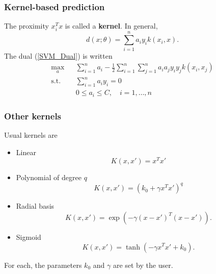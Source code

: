 \begin{frame}
\frametitle{Kernel-based prediction}
The proximity $x_i^Tx$ is called a {\bf kernel}. In general,
$$
d(x;\theta) = \sum_{i=1}^n a_i y_i k(x_i,x).
$$
The dual (\ref{SVM_Dual}) is written
\begin{eqnarray*}
\nonumber \max_{a} &&   \sum_{i=1}^n a_i - \frac{1}{2}\sum_{i=1}^n\sum_{j=1}^n a_i a_j y_iy_j k(x_i,x_j)\\
\mbox{s.t. } && \sum_{i=1}^n a_i y_i = 0\\
\nonumber && 0 \leq a_i \leq C, \quad i=1,\ldots ,n
\end{eqnarray*}
\end{frame}
\begin{frame}
\frametitle{Other kernels}
Usual kernels are 
\begin{itemize}
\item Linear
$$
K(x,x') = x^Tx'
$$
\item Polynomial of degree $q$
$$
K(x,x') = \left(k_0 + \gamma x^Tx'\right)^q
$$
\item Radial basis
$$
K(x,x') = \exp\left(-\gamma (x-x')^T(x-x')\right).
$$
\item Sigmoid
$$
K(x,x') = \tanh\left(-\gamma x^Tx' + k_0\right).
$$
\end{itemize}
For each, the parameters $k_0$ and $\gamma$ are set by the user.
\end{frame}
